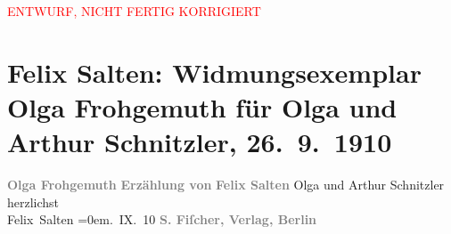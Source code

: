 
\begin{center}
            \textcolor{red}{ENTWURF, NICHT FERTIG KORRIGIERT}
                      \end{center}
            
         
         \renewcommand{\erwaehntePersonen}{Personen: Olga Schnitzler}
         \renewcommand{\erwaehnteInstitutionen}{Institutionen: S. Fischer Verlag}
         \renewcommand{\erwaehnteOrte}{Orte: Berlin, Wien}
         \renewcommand{\erwaehnteWerke}{Werke: Olga Frohgemuth. Erzählung}
               \section[Felix Salten: Widmungsexemplar Olga Frohgemuth für Olga und Arthur Schnitzler, 26. 9. 1910]{ Felix Salten: Widmungsexemplar Olga Frohgemuth für Olga und Arthur
               Schnitzler, 26. 9. 1910}\nopagebreak{}\rehead{ }\begin{ledgroupsized}[t]{13cm}\normalsize\beginnumbering \toendnotes[C]{\smallbreak\pagebreak[2]} 
\pstart
           \noindent{}\centering{}{\pb}\textcolor{gray}{\textbf{Olga Frohgemuth}}\pend
           \pstart
           \noindent{}\centering{}\textcolor{gray}{\textbf{Erzählung von}}\pend
           \pstart
           \noindent{}\centering{}\textcolor{gray}{\textbf{Felix Salten}}\pend
           {\bigskip}\pstart
           \noindent{}Olga und Arthur Schnitzler\pend
           \pstart
           herzlichst{\\[\baselineskip]}\spacefill\mbox{Felix Salten}\pend
           \leftskip=0em{}. IX. 10\pend
           {\bigskip}\pstart
           \noindent{}\centering{}\textcolor{gray}{\textbf{S. Fiſcher, Verlag, Berlin}}\pend
           
         
         \endnumbering{}\end{ledgroupsized}\begin{anhang}\end{anhang}\newcommand{\dateiname}{L03047}\newcommand{\titel}{Felix Salten: Widmungsexemplar Olga Frohgemuth für Olga und Arthur Schnitzler, 26. 9. 1910}\newcommand{\editorInnen}{Martin Anton Müller und Laura Untner}
      